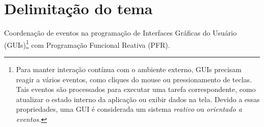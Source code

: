 \section{Delimitação do tema}\label{ldelimitacao}

Coordenação de eventos na programação de Interfaces Gráficas
do Usuário (GUIs)\footnote{
  Para manter interação contínua com o ambiente externo, GUIs
  precisam reagir a vários eventos, como cliques do mouse ou
  pressionamento de teclas.
  Tais eventos são processados para
  executar uma tarefa correspondente, como atualizar o estado interno
  da aplicação ou exibir dados na tela.
  Devido a essas propriedades, uma GUI é considerada um sistema
  \emph{reativo} ou \emph{orientado a eventos.}
} com Programação Funcional Reativa (PFR).
